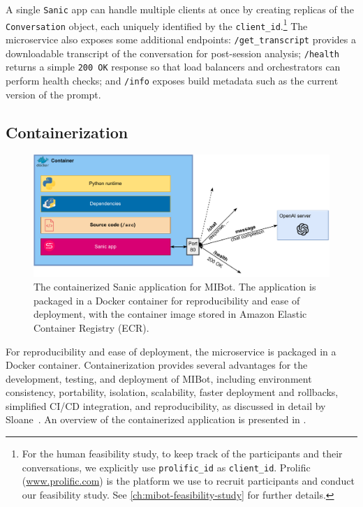 A single \texttt{Sanic} app can handle multiple clients at once by creating replicas of
the \texttt{Conversation} object, each uniquely identified by the
\texttt{client\_id}.\footnote{For the human feasibility study, to keep track of the
	participants and their conversations, we explicitly use \texttt{prolific\_id} as
	\texttt{client\_id}. Prolific (\url{www.prolific.com}) is the platform we use to
	recruit participants and conduct our feasibility study. See
	\cref{ch:mibot-feasibility-study} for further details.} The microservice also exposes
some additional endpoints: \texttt{/get\_transcript} provides a downloadable transcript
of the conversation for post-session analysis; \texttt{/health} returns a simple
\texttt{200 OK} response so that load balancers and orchestrators can perform health
checks; and \texttt{/info} exposes build metadata such as the current version of the
prompt.

\subsection{Containerization}

\begin{figure}[ht]
	\centering
	\includegraphics[width=0.7\linewidth]{fig/container.drawio.pdf}
	\caption[Containerized MIBot Application]{The containerized Sanic application for MIBot. The application is packaged in a Docker container for reproducibility and ease of deployment, with the container image stored in Amazon Elastic Container Registry (ECR).}
	\label{fig:containerization}
\end{figure}

For reproducibility and ease of deployment, the microservice is packaged in a Docker
container. Containerization provides several advantages for the development, testing,
and deployment of MIBot, including environment consistency, portability, isolation,
scalability, faster deployment and rollbacks, simplified CI/CD integration, and
reproducibility, as discussed in detail by Sloane~\citep{sloane2025containerization}.
An overview of the containerized application is presented in
.

